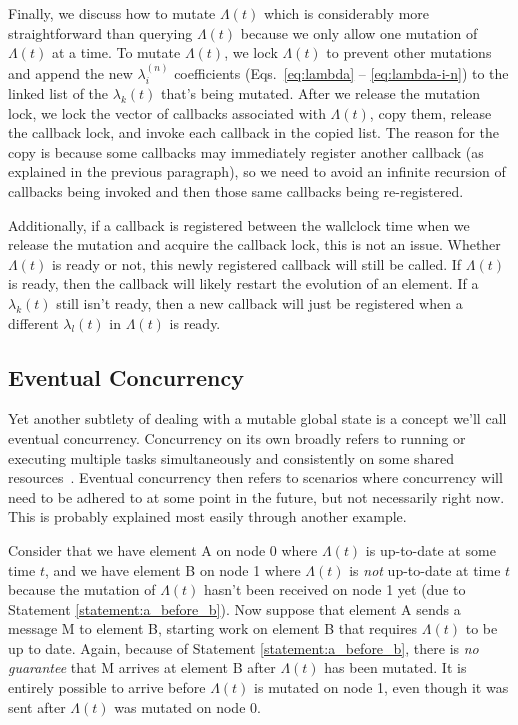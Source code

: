\begin{bibunit}[unsrtnat]
Finally, we discuss how to mutate $\Lambda(t)$ which is considerably more
straightforward than querying $\Lambda(t)$ because we only allow one mutation of
$\Lambda(t)$ at a time. To mutate $\Lambda(t)$, we lock $\Lambda(t)$ to prevent
other mutations and append the new $\lambda_i^{(n)}$ coefficients
(Eqs.~\eqref{eq:lambda} -- \eqref{eq:lambda-i-n}) to the linked list of the
$\lambda_k(t)$ that's being mutated. After we release the mutation lock, we lock
the vector of callbacks associated with $\Lambda(t)$, copy them, release the
callback lock, and invoke each callback in the copied list. The reason for the
copy is because some callbacks may immediately register another callback (as
explained in the previous paragraph), so we need to avoid an infinite recursion
of callbacks being invoked and then those same callbacks being re-registered.

Additionally, if a callback is registered between the wallclock time when we
release the mutation and acquire the callback lock, this is not an issue.
Whether $\Lambda(t)$ is ready or not, this newly registered callback will still
be called. If $\Lambda(t)$ is ready, then the callback will likely restart the
evolution of an element. If a $\lambda_k(t)$ still isn't ready, then a new
callback will just be registered when a different $\lambda_l(t)$ in
$\Lambda(t)$ is ready.

\subsection{Eventual Concurrency}

Yet another subtlety of dealing with a mutable global state is a concept we'll
call eventual concurrency. Concurrency on its own broadly refers to running or
executing multiple tasks simultaneously and consistently on some shared
resources~\cite{10.5555/174770}. Eventual concurrency then refers to scenarios
where concurrency will need to be adhered to at some point in the future, but
not necessarily right now. This is probably explained most easily through
another
example.

Consider that we have element A on node 0 where $\Lambda(t)$ is up-to-date at
some time $t$, and we have element B on node 1 where $\Lambda(t)$ is
\textit{not} up-to-date at time $t$ because the mutation of $\Lambda(t)$ hasn't
been received on node 1 yet (due to Statement \ref{statement:a_before_b}).
Now suppose that element A sends a message M to element B, starting work on
element B that requires $\Lambda(t)$ to be up to date. Again, because of
Statement \ref{statement:a_before_b}, there is \textit{no guarantee} that M
arrives at element B after $\Lambda(t)$ has been mutated. It is entirely
possible to arrive before $\Lambda(t)$ is mutated on node 1, even though it was
sent after $\Lambda(t)$ was mutated on node 0.


\end{bibunit}
